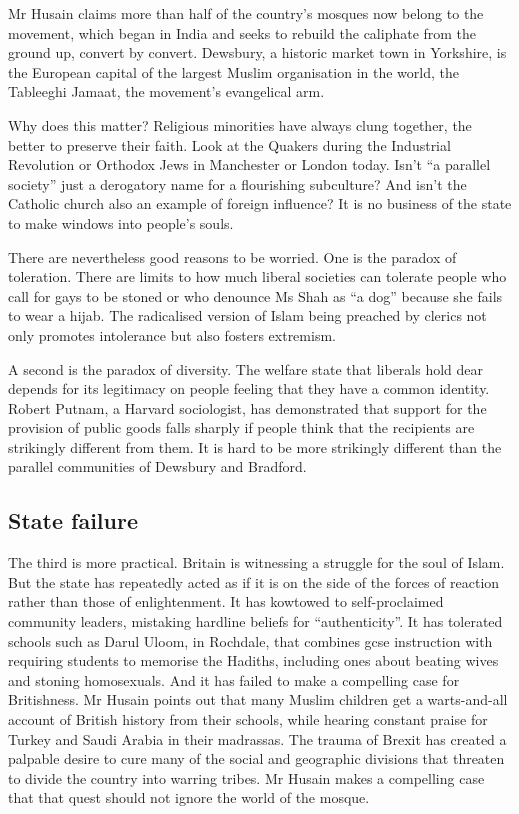 Mr Husain claims more than half of the country’s mosques now belong to the movement, which began in India and seeks to rebuild the caliphate from the ground up, convert by convert. Dewsbury, a historic market town in Yorkshire, is the European capital of the largest Muslim organisation in the world, the Tableeghi Jamaat, the movement’s evangelical arm.

Why does this matter? Religious minorities have always clung together, the better to preserve their faith. Look at the Quakers during the Industrial Revolution or Orthodox Jews in Manchester or London today. Isn’t “a parallel society” just a derogatory name for a flourishing subculture? And isn’t the Catholic church also an example of foreign influence? It is no business of the state to make windows into people’s souls.

There are nevertheless good reasons to be worried. One is the paradox of toleration. There are limits to how much liberal societies can tolerate people who call for gays to be stoned or who denounce Ms Shah as “a dog” because she fails to wear a hijab. The radicalised version of Islam being preached by clerics not only promotes intolerance but also fosters extremism.

A second is the paradox of diversity. The welfare state that liberals hold dear depends for its legitimacy on people feeling that they have a common identity. Robert Putnam, a Harvard sociologist, has demonstrated that support for the provision of public goods falls sharply if people think that the recipients are strikingly different from them. It is hard to be more strikingly different than the parallel communities of Dewsbury and Bradford.
\subsection{State failure}
The third is more practical. Britain is witnessing a struggle for the soul of Islam. But the state has repeatedly acted as if it is on the side of the forces of reaction rather than those of enlightenment. It has kowtowed to self-proclaimed community leaders, mistaking hardline beliefs for “authenticity”. It has tolerated schools such as Darul Uloom, in Rochdale, that combines gcse instruction with requiring students to memorise the Hadiths, including ones about beating wives and stoning homosexuals. And it has failed to make a compelling case for Britishness. Mr Husain points out that many Muslim children get a warts-and-all account of British history from their schools, while hearing constant praise for Turkey and Saudi Arabia in their madrassas. The trauma of Brexit has created a palpable desire to cure many of the social and geographic divisions that threaten to divide the country into warring tribes. Mr Husain makes a compelling case that that quest should not ignore the world of the mosque. 
